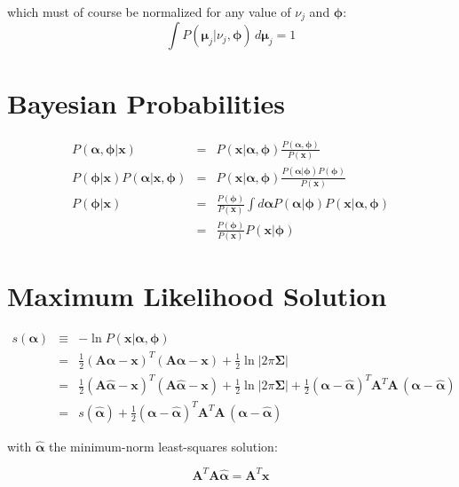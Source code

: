 \documentclass{amsart}
\newcommand{\bm}[1]{\ensuremath{\boldsymbol{#1}}}
\begin{document}
which must of course be normalized for any value of $\nu_j$ and $\bm{\phi}$:
\begin{equation}
  \int P(\bm{\mu}_j|\nu_j,\bm{\phi})\,d\bm{\mu}_j = 1
\end{equation}

\section{Bayesian Probabilities}

\begin{eqnarray}
  P(\bm{\alpha},\bm{\phi}|\bm{x}) &=& P(\bm{x}|\bm{\alpha},\bm{\phi})
  \frac{P(\bm{\alpha},\bm{\phi})}{P(\bm{x})} \\
  P(\bm{\phi}|\bm{x})P(\bm{\alpha}|\bm{x},\bm{\phi}) &=&
  P(\bm{x}|\bm{\alpha},\bm{\phi})\frac{P(\bm{\alpha}|\bm{\phi}) P(\bm{\phi})}{P(\bm{x})}
  \\
  P(\bm{\phi}|\bm{x}) &=& \frac{P(\bm{\phi})}{P(\bm{x})}
  \int d\bm{\alpha} P(\bm{\alpha}|\bm{\phi}) P(\bm{x}|\bm{\alpha},\bm{\phi}) \\
  &=& \frac{P(\bm{\phi})}{P(\bm{x})} P(\bm{x}|\bm{\phi})
\end{eqnarray}

\section{Maximum Likelihood Solution}

\begin{eqnarray}
  s(\bm{\alpha}) &\equiv& -\ln
  P(\bm{x}|\bm{\alpha},\bm{\phi}) \\
  &=& \frac{1}{2}(\bm{A}\bm{\alpha}-\bm{x})^T(\bm{A}\bm{\alpha}-\bm{x})
  +\frac{1}{2}\ln\left|2\pi\bm{\Sigma}\right| \\
  &=& \frac{1}{2}(\bm{A}\hat{\bm{\alpha}}-\bm{x})^T(\bm{A}\hat{\bm{\alpha}}-\bm{x})
  +\frac{1}{2}\ln\left|2\pi\bm{\Sigma}\right| 
  +\frac{1}{2}(\bm{\alpha} -\hat{\bm{\alpha}})^T\! 
  \bm{A}^T\!\bm{A} \,(\bm{\alpha}-\hat{\bm{\alpha}}) \\
  &=& s(\hat{\bm{\alpha}}) + 
  \frac{1}{2}(\bm{\alpha}-\hat{\bm{\alpha}})^T\! 
  \bm{A}^T\!\bm{A}\,(\bm{\alpha}-\hat{\bm{\alpha}})
\end{eqnarray}

with $\hat{\bm{\alpha}}$ the minimum-norm least-squares solution:

\begin{equation}
  \bm{A}^T\!\bm{A} \hat{\bm{\alpha}} = \bm{A}^T\bm{x}
\end{equation}
\end{document}
